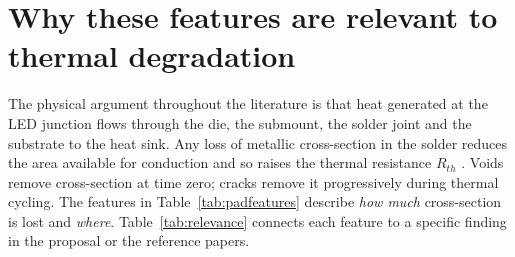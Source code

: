 \documentclass[11pt,a4paper]{article}
\begin{document}
\section{Why these features are relevant to thermal degradation}
\label{sec:relevance}

The physical argument throughout the literature is that heat generated at the LED junction
flows through the die, the submount, the solder joint and the substrate to the heat sink. Any
loss of metallic cross-section in the solder reduces the area available for conduction and so
raises the thermal resistance $R_{th}$ \cite{part1,zippelius2022}. Voids remove cross-section
at time zero; cracks remove it progressively during thermal cycling. The features in
Table~\ref{tab:padfeatures} describe \emph{how much} cross-section is lost and \emph{where}.
Table~\ref{tab:relevance} connects each feature to a specific finding in the proposal or the
reference papers.
\end{document}
